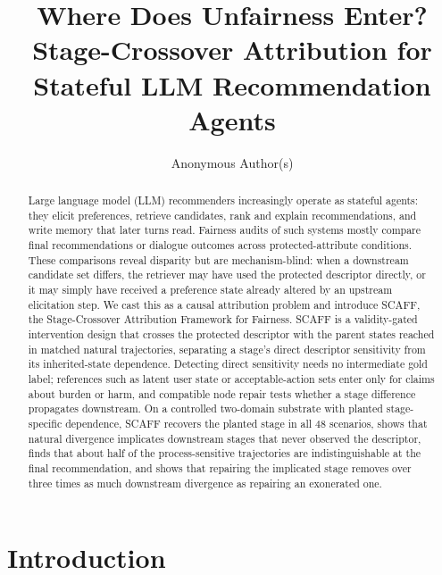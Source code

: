 \documentclass[runningheads]{llncs}
\begin{document}
%
\title{Where Does Unfairness Enter? Stage-Crossover Attribution for Stateful LLM Recommendation Agents}
%
\author{Anonymous Author(s)}
%
\maketitle
%
\begin{abstract}
Large language model (LLM) recommenders increasingly operate as stateful agents: they elicit
preferences, retrieve candidates, rank and explain recommendations, and write memory that later
turns read. Fairness audits of such systems mostly compare final recommendations or dialogue
outcomes across protected-attribute conditions. These comparisons reveal disparity but are
mechanism-blind: when a downstream candidate set differs, the retriever may have used the
protected descriptor directly, or it may simply have received a preference state already
altered by an upstream elicitation step. We cast this as a causal attribution problem and
introduce SCAFF, the Stage-Crossover Attribution Framework for Fairness. SCAFF is a
validity-gated intervention design that crosses the protected descriptor with the parent states
reached in matched natural trajectories, separating a stage's direct descriptor sensitivity from
its inherited-state dependence. Detecting direct sensitivity needs no intermediate gold label;
references such as latent user state or acceptable-action sets enter only for claims about
burden or harm, and compatible node repair tests whether a stage difference propagates
downstream. On a controlled two-domain substrate with planted stage-specific dependence, SCAFF
recovers the planted stage in all 48 scenarios, shows that natural divergence implicates
downstream stages that never observed the descriptor, finds that about half of the
process-sensitive trajectories are indistinguishable at the final recommendation, and shows that
repairing the implicated stage removes over three times as much downstream divergence as
repairing an exonerated one.

\end{abstract}
%
\section{Introduction}
\label{sec:intro}
\end{document}
